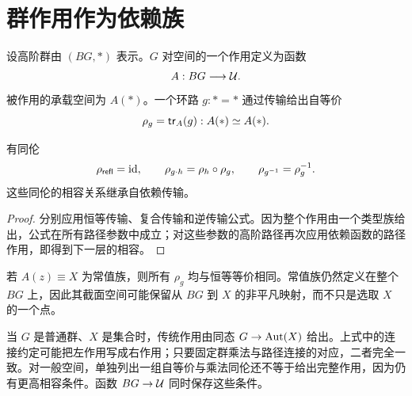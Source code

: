\section{群作用作为依赖族}
\begin{definition}[高阶群作用]
设高阶群由 $(BG,*)$ 表示。$G$ 对空间的一个作用定义为函数
\[
A:BG\longrightarrow\mathcal U.
\]
被作用的承载空间为 $A(*)$。一个环路 $g:*=*$ 通过传输给出自等价
\[
\rho_g=\mathsf{tr}_A(g):A(*)\simeq A(*).
\]
\end{definition}
\begin{proposition}[作用律]
有同伦
\[
\rho_{\mathsf{refl}}=\operatorname{id},
\qquad
\rho_{g\cdot h}=\rho_h\circ\rho_g,
\qquad
\rho_{g^{-1}}=\rho_g^{-1}.
\]
这些同伦的相容关系继承自依赖传输。
\end{proposition}
\begin{proof}
分别应用恒等传输、复合传输和逆传输公式。因为整个作用由一个类型族给出，公式在所有路径参数中成立；对这些参数的高阶路径再次应用依赖函数的路径作用，即得到下一层的相容。
\end{proof}
\begin{example}[平凡作用]
若 $A(z)\equiv X$ 为常值族，则所有 $\rho_g$ 均与恒等等价相同。常值族仍然定义在整个 $BG$ 上，因此其截面空间可能保留从 $BG$ 到 $X$ 的非平凡映射，而不只是选取 $X$ 的一个点。
\end{example}
\begin{remark}
当 $G$ 是普通群、$X$ 是集合时，传统作用由同态 $G\to\operatorname{Aut}(X)$ 给出。上式中的连接约定可能把左作用写成右作用；只要固定群乘法与路径连接的对应，二者完全一致。对一般空间，单独列出一组自等价与乘法同伦还不等于给出完整作用，因为仍有更高相容条件。函数 $BG\to\mathcal U$ 同时保存这些条件。
\end{remark}

